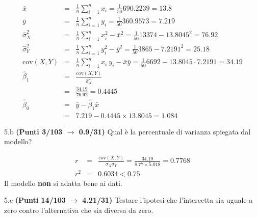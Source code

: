 \documentclass[
  11pt,
]{book}
\theoremstyle{mytheoremstyle}
\theoremstyle{mydefstyle}
\newenvironment{sol}
  {
  \begin{tcolorbox}[enhanced,breakable,arc=0.1mm,boxrule=1pt,colback=white,colframe=iblue,
  title=\bf \fontfamily{lmss}\selectfont \hspace{.5 cm} Soluzione,drop fuzzy shadow]

}{
\end{tcolorbox}
  }
\begin{document}
\begin{sol}
\begin{eqnarray*}
           \bar x &=&\frac 1 n\sum_{i=1}^n x_i = \frac {1}{ 50 }  690.2239 =  13.8 \\
           \bar y &=&\frac 1 n\sum_{i=1}^n y_i = \frac {1}{ 50 }  360.9573 =  7.219 \\
           \hat\sigma_X^2&=&\frac 1 n\sum_{i=1}^n x_i^2-\bar x^2=\frac {1}{ 50 }  13374  - 13.8045 ^2= 76.92 \\
           \hat\sigma_Y^2&=&\frac 1 n\sum_{i=1}^n y_i^2-\bar y^2=\frac {1}{ 50 }  3865  - 7.2191 ^2= 25.18 \\
           \text{cov}(X,Y)&=&\frac 1 n\sum_{i=1}^n x_i~y_i-\bar x\bar y=\frac {1}{ 50 }  6692 - 13.8045 \cdot 7.2191 = 34.19 \\
           \hat\beta_1 &=& \frac{\text{cov}(X,Y)}{\hat\sigma_X^2} \\
                    &=& \frac{ 34.19 }{ 76.92 }  =  0.4445 \\
           \hat\beta_0 &=& \bar y - \hat\beta_1 \bar x\\
                    &=&  7.219 - 0.4445 \times  13.8045 = 1.084 
         \end{eqnarray*}

\end{sol}

5.b \textbf{(Punti 3/103 \(\rightarrow\) 0.9/31)} Qual è la percentuale di varianza spiegata dal modello?

\begin{sol}
\begin{eqnarray*}
r&=&\frac{\text{cov}(X,Y)}{\sigma_X\sigma_Y}=\frac{ 34.19 }{ 8.77 \times 5.018 }= 0.7768 \\r^2&=& 0.6034 < 0.75
\end{eqnarray*}
Il modello \textbf{non} si adatta bene ai dati.

\end{sol}

5.c \textbf{(Punti 14/103 \(\rightarrow\) 4.21/31)} Testare l'ipotesi che l'intercetta sia uguale a zero contro l'alternativa che sia diversa da zero.
\end{document}
